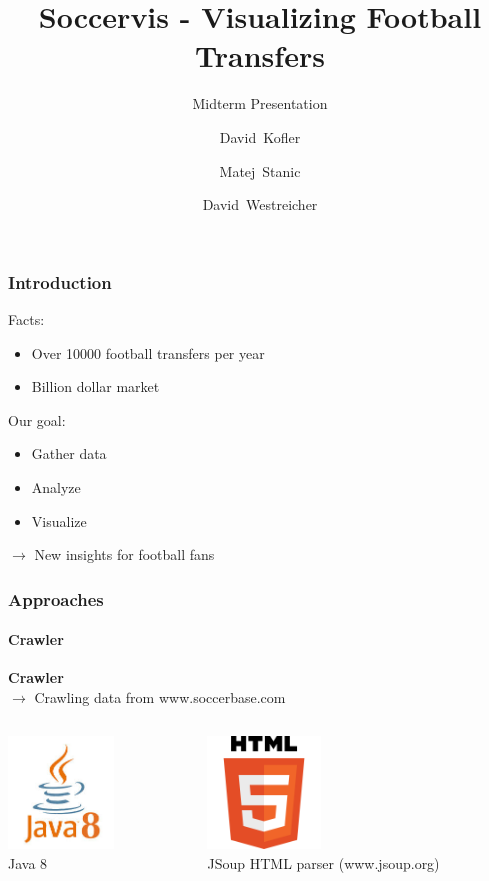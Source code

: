 \documentclass{beamer}
\title[Soccervis] %
{Soccervis - Visualizing Football Transfers}
\subtitle{Midterm Presentation}
\author[Kofler, Stanic, Westreicher] %
{David~Kofler \and Matej~Stanic \and David~Westreicher}
\begin{document}
\frame{\titlepage}


  \begin{frame}
    \frametitle{Introduction}
		Facts:
		\begin{itemize}
			\item Over 10000 football transfers per year
			\item Billion dollar market 
		\end{itemize}
		Our goal: 
		\begin{itemize}
			\item Gather data
			\item Analyze
			\item Visualize
		\end{itemize}
		$\rightarrow$ New insights for football fans
  \end{frame}
	
  \begin{frame}
    \frametitle{Approaches}
		\framesubtitle{Crawler}
		\textbf{Crawler} \\ 
		$\rightarrow$ Crawling data from www.soccerbase.com
		\begin{columns}[T] %
    \begin{column}[T]{5cm} %
			\begin{center}
      \includegraphics[height=3cm]{java8.jpg}\\
			Java 8
			\end{center}
    \end{column}
    \begin{column}[T]{5cm} %
		\begin{center}
		 \includegraphics[height=3cm]{html.png} \\ 
			JSoup HTML parser (www.jsoup.org)
		\end{center}	
    \end{column}
    \end{columns}   
  \end{frame}
	
\end{document}

